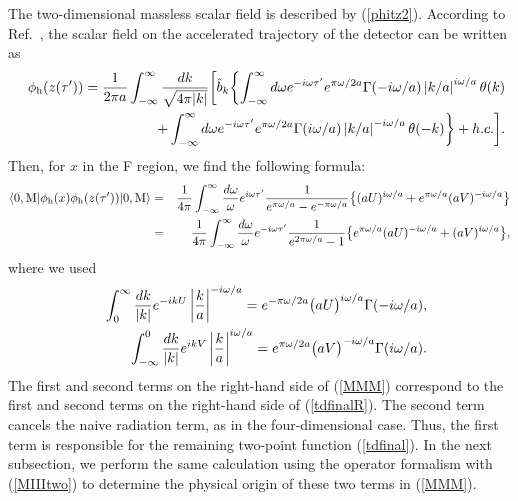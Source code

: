 \documentclass[aps,prd,preprintnumbers,nofootinbib,showpacs,11pt]{revtex4}%
\begin{document}
\begin{widetext}
The two-dimensional massless scalar field is described by (\ref{phitz2}). 
According to Ref.~\cite{HuRaval}, the scalar field on the accelerated 
trajectory of the detector can be written as
\begin{eqnarray}
&&\phi_{\rm h}(z(\tau^{\prime}))
=
{1\over 2 \pi a}
\int_{-\infty}^{\infty} {dk\over \sqrt{4\pi |k|}} 
\biggl[\hat b_k\biggl\{
\int_{-\infty}^{\infty} d\omega 
e^{-i\omega \tau'} e^{\pi \omega / 2a}
\Gamma(-{i\omega/ a}) \left|{k/ a}\right|^{i\omega / a}\theta(k) 
\nonumber\\
&&~~~~~~~~~~~~~~~
+
\int_{-\infty}^{\infty} d\omega 
e^{-i\omega \tau'} e^{\pi \omega / 2a}
\Gamma({i\omega / a}) \left|{k / a}\right|^{-i\omega / a} \theta(-k) \biggr\}
+h.c.\biggr].
\label{2MphiO}
\end{eqnarray}
Then, for $x$ in the F region, we find the following formula:
\begin{eqnarray}
\langle 0,{\rm M}| 
\phi_{\rm h}(x) \phi_{\rm h} (z(\tau'))|0, {\rm M}\rangle
&=&{1\over {4 \pi }}\int_{-\infty}^{\infty} {d\omega\over \omega}
e^{i\omega \tau^{\prime}} 
{1\over e^{\pi\omega/a}-e^{-\pi\omega/a}}
\bigl\{
({aU})^{{i\omega / a}} 
+  e^{\pi\omega/a}({aV})^{-i\omega /a}\bigr\}
\nonumber \\
&=&{1\over {4 \pi }}\int_{-\infty}^{\infty} {d\omega\over \omega}
e^{-i\omega \tau^{\prime}} 
{1\over e^{2\pi\omega/a}-1}
\bigl\{e^{\pi\omega/a}
({aU})^{{-i\omega / a}} 
+  ({aV})^{i\omega /a}\bigr\},
\label{MMM}
\end{eqnarray}
where we used  
\begin{eqnarray}
&&\int_0 ^{\infty} {dk \over |k|} e^{-ikU}
\left|{k \over a}\right|^{-i\omega / a}
=
e^{-{\pi \omega / 2a}}
\bigl( { aU} \bigr) ^{{i\omega /a}}
\Gamma(-{i\omega /a}),
\nonumber\\
&&\int_{-\infty} ^0 {dk \over |k|} e^{ikV}
\left|{k \over a}\right|^{i\omega / a} 
=
e^{\pi \omega / 2a}
\bigl( {aV} \bigr) ^{-i\omega /a}
\Gamma({i\omega/ a}).
\nonumber
\end{eqnarray}
The first and second terms on the right-hand side of (\ref{MMM})
correspond to the first and second terms on the right-hand side of 
(\ref{tdfinalR}).
The second term cancels the naive radiation term, as in the four-dimensional case.
Thus, the first term is responsible for the remaining two-point function (\ref{tdfinal}).
In the next subsection, we perform the same calculation
using the operator formalism with (\ref{MIIItwo}) to determine the physical origin of 
these two terms in (\ref{MMM}).




\end{widetext}
\end{document}
